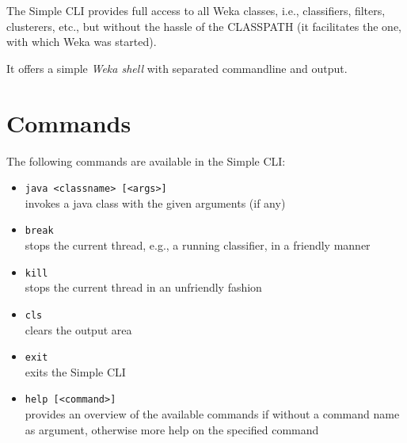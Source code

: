 %
%
%
%


The Simple CLI provides full access to all Weka classes, i.e., classifiers, filters, clusterers, etc., but without the hassle of the CLASSPATH (it facilitates the one, with which Weka was started).

It offers a simple \textit{Weka shell} with separated commandline and output.

\begin{center}
\end{center}


\section{Commands}
The following commands are available in the Simple CLI:
\begin{itemize}
	\item \texttt{java <classname> [<args>]} \\
		invokes a java class with the given arguments (if any)
	\item \texttt{break} \\
		stops the current thread, e.g., a running classifier, in a friendly manner
	\item \texttt{kill} \\
		stops the current thread in an unfriendly fashion
	\item \texttt{cls} \\
		clears the output area
	\item \texttt{exit} \\
		exits the Simple CLI
	\item \texttt{help [<command>]} \\
		provides an overview of the available commands if without a command name as argument, otherwise more help on the specified command
\end{itemize}


